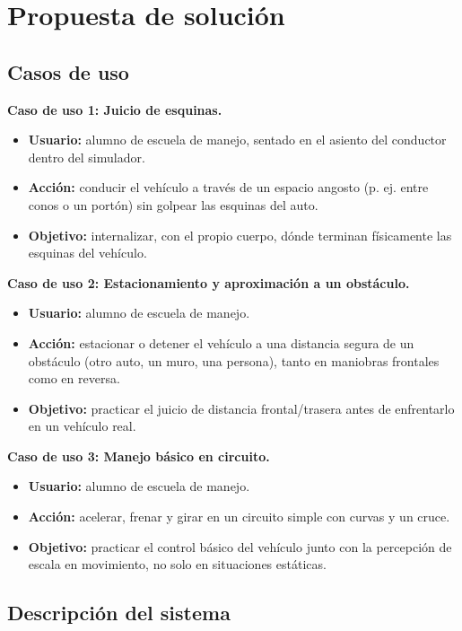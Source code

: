 \documentclass[conference]{IEEEtran}
\begin{document}
\section{Propuesta de solución}
\label{sec:propuesta}

\subsection{Casos de uso}

\textbf{Caso de uso 1: Juicio de esquinas.}
\begin{itemize}
    \item \textbf{Usuario:} alumno de escuela de manejo, sentado en el
    asiento del conductor dentro del simulador.
    \item \textbf{Acción:} conducir el vehículo a través de un espacio
    angosto (p. ej. entre conos o un portón) sin golpear las esquinas
    del auto.
    \item \textbf{Objetivo:} internalizar, con el propio cuerpo,
    dónde terminan físicamente las esquinas del vehículo.
\end{itemize}

\textbf{Caso de uso 2: Estacionamiento y aproximación a un obstáculo.}
\begin{itemize}
    \item \textbf{Usuario:} alumno de escuela de manejo.
    \item \textbf{Acción:} estacionar o detener el vehículo a una
    distancia segura de un obstáculo (otro auto, un muro, una
    persona), tanto en maniobras frontales como en reversa.
    \item \textbf{Objetivo:} practicar el juicio de distancia
    frontal/trasera antes de enfrentarlo en un vehículo real.
\end{itemize}

\textbf{Caso de uso 3: Manejo básico en circuito.}
\begin{itemize}
    \item \textbf{Usuario:} alumno de escuela de manejo.
    \item \textbf{Acción:} acelerar, frenar y girar en un circuito
    simple con curvas y un cruce.
    \item \textbf{Objetivo:} practicar el control básico del
    vehículo junto con la percepción de escala en movimiento, no solo
    en situaciones estáticas.
\end{itemize}

\subsection{Descripción del sistema}
\end{document}
